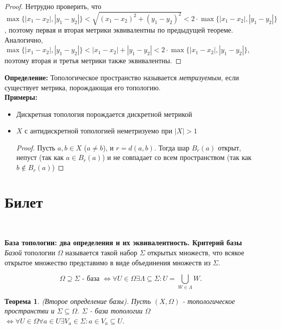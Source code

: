 \documentclass[a4paper,100pt]{article}
\theoremstyle{indented}
\newtheorem{theorem}{Теорема}
\begin{document}
\begin{proof} Нетрудно проверить, что $\max\{|x_1-x_2|, |y_1-y_2|\}<\sqrt{(x_1-x_2)^2+(y_1-y_2)^2} < 2 \cdot \max\{|x_1-x_2|, |y_1-y_2|\}$, поэтому первая и вторая метрики эквивалентны по предыдущей теореме. Аналогично, $\max\{|x_1-x_2|, |y_1-y_2|\}< |x_1-x_2|+|y_1-y_2| < 2 \cdot \max\{|x_1-x_2|, |y_1-y_2|\}$, поэтому вторая и третья метрики также эквивалентны.
\end{proof}

\textbf{Определение: } Топологическое пространство \hypertarget{n15}{называется} \textit{метризуемым}, если существует метрика, порождающая его топологию.
\\

\textbf{Примеры: } 
\begin{itemize}
    \item Дискретная топология порождается дискретной метрикой 
    \item $X$ с антидискретной топологией неметризуемо при $|X|>1$
    
    \begin{proof} Пусть $a, b \in X$ ($a \neq b$), и $r=d(a, b)$. Тогда шар $B_r(a)$ открыт, непуст (так как $a \in B_r(a)$) и не совпадает со всем пространством (так как $b \notin B_r(a)$)
    \end{proof}
\end{itemize}

\section{Билет} \

\medskip

\textbf{База топологии: два определения и их эквивалентность. Критерий базы}\\

\textit{Базой} \hypertarget{n16}{топологии} $\Omega$ называется такой набор $\Sigma$ открытых множеств, что всякое открытое множество представимо в виде объединения множеств из $\Sigma$.

\[
    \Omega \supseteq \Sigma \text{ - база } \Leftrightarrow \forall U \in \Omega \exists \Lambda \subseteq \Sigma : U = \bigcup_{W\in \Lambda} W.
\]

\begin{theorem}
    (Второе определение базы). Пусть $(X, \Omega)$ - топологическое пространстви и $\Sigma \subseteq \Omega$. $\Sigma$ - база топологии $\Omega$ $\Longleftrightarrow \forall U \in \Omega \forall a \in U \exists V_a \in \Sigma : a\in V_a \subseteq U$.
\end{theorem}
\end{document}
